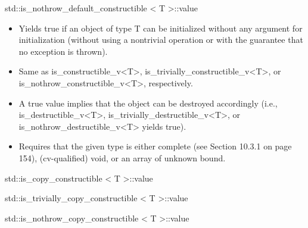 std::is\_nothrow\_default\_constructible < T >::value

\begin{itemize}
\item 
Yields true if an object of type T can be initialized without any argument for initialization (without using a nontrivial operation or with the guarantee that no exception is thrown).

\item 
Same as is\_constructible\_v<T>, is\_trivially\_constructible\_v<T>, or is\_nothrow\_constructible\_v<T>, respectively.

\item 
A true value implies that the object can be destroyed accordingly (i.e., is\_destructible\_v<T>, is\_trivially\_destructible\_v<T>, or is\_nothrow\_destructible\_v<T> yields true).

\item 
Requires that the given type is either complete (see Section 10.3.1 on page 154), (cv-qualified) void, or an array of unknown bound.
\end{itemize}

std::is\_copy\_constructible < T >::value

std::is\_trivially\_copy\_constructible < T >::value

std::is\_nothrow\_copy\_constructible < T >::value

